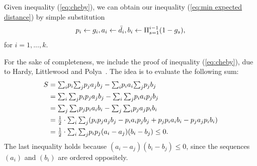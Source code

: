\documentclass[oneside,final]{ucr}
\begin{document}
Given inequality (\ref{eq:cheby}), we can obtain our
inequality (\ref{eq:min expected distance}) by simple
substitution
%
\begin{equation*}
  p_i \leftarrow g_i, a_i \leftarrow {\bar d}_i, b_i \leftarrow
  \Pi_{s=1}^{i-1} (1-g_s),
\end{equation*}
%
for $i = 1,...,k$.

For the sake of completeness, we include the proof of
inequality (\ref{eq:cheby}), due to Hardy, Littlewood and
Polya~\cite{HardyLP88}. The idea is to evaluate the
following sum:
%
\begin{align*}
  S &= \textstyle{\sum_i} p_i \textstyle{\sum_j} p_j a_j b_j - \textstyle{\sum_i} p_i a_i \textstyle{\sum_j} p_j b_j
	\\
  & = \textstyle{\sum_i \sum_j} p_i p_j a_j b_j - \textstyle{\sum_i \sum_j} p_i a_i p_j b_j
	\\
  & = \textstyle{\sum_j \sum_i} p_j p_i a_i b_i - \textstyle{\sum_j \sum _i} p_j a_j p_i b_i
	\\
	&= {\mbox{$\frac{1}{2}$}} \cdot \textstyle{\sum_i \sum_j} (p_i p_j a_j b_j - p_i a_i p_j b_j + p_j p_i a_i
  							b_i - p_j a_j p_i b_i)
\\
  &= {\mbox{$\frac{1}{2}$}} \cdot \textstyle{\sum_i \sum_j} p_i p_j (a_i - a_j)(b_i - b_j) \leq 0.
\end{align*}
The last inequality holds because $(a_i-a_j)(b_i-b_j) \leq
0$, since the sequences $(a_i)$ and $(b_i)$ are ordered
oppositely.
\end{document}
